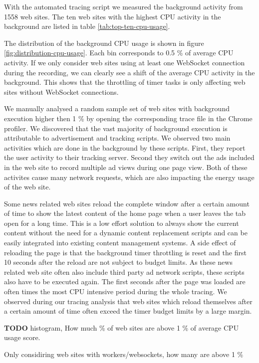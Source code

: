 \documentclass[
	ruledheaders=section,%
	class=report,%
	thesis={type=bachelor},%
	accentcolor=9c,%
	custommargins=true,%
	marginpar=false,%
	parskip=half-,%
	fontsize=11pt,%
]{tudapub}
\begin{document}
  With the automated tracing script we measured the background activity from 1558 web sites. The ten web sites with the highest CPU activity in the background are listed in table \ref{tab:top-ten-cpu-usage}.

  The distribution of the background CPU usage is shown in figure \ref{fig:distribution-cpu-usage}. Each bin corresponds to 0.5 \% of average CPU activity. If we only consider web sites using at least one WebSocket connection during the recording, we can clearly see a shift of the average CPU activity in the background. This shows that the throttling of timer tasks is only affecting web sites without WebSocket connections.
  

  We manually analysed a random sample set of web sites with background execution higher then 1 \% by opening the corresponding trace file in the Chrome profiler. We discovered that the vast majority of background execution is attributable to advertisement and tracking scripts. We observed two main activities which are done in the background by these scripts. First, they report the user activity to their tracking server. Second they switch out the ads included in the web site to record multiple ad views during one page view. Both of these activites cause many network requests, which are also impacting the energy usage of the web site.
  
  Some news related web sites reload the complete window after a certain amount of time to show the latest content of the home page when a user leaves the tab open for a long time. This is a low effort solution to always show the current content without the need for a dynamic content replacement scripts and can be easily integrated into existing content management systems. A side effect of reloading the page is that the background timer throttling is reset and the first 10 seconds after the reload are not subject to budget limits. As these news related web site often also include third party ad network scripts, these scripts also have to be executed again. The first seconds after the page was loaded are often times the most CPU intensive period during the whole tracing. We observed during our tracing analysis that web sites which reload themselves after a certain amount of time often exceed the timer budget limits by a large margin.


  \textbf{TODO} histogram, How much \% of web sites are above 1 \% of average CPU usage score.

  Only considiring web sites with workers/websockets, how many are above 1 \%
\end{document}
